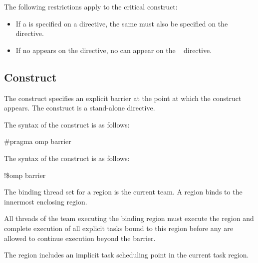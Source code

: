 \fortranspecificstart
The following restrictions apply to the critical construct:

\begin{itemize}
\item If a  is specified on a  directive, the same  must also be 
specified on the ~ directive. 

\item If no  appears on the  directive, no  can appear on the 
~ directive.
\end{itemize}
\fortranspecificend











\subsection{ Construct}
\label{subsec:barrier Construct}
\summary
The  construct specifies an explicit barrier at the point at which the construct 
appears. The  construct is a stand-alone directive.

\syntax
\ccppspecificstart
The syntax of the  construct is as follows:

\begin{boxedcode}
\#pragma omp barrier 
\end{boxedcode}
\ccppspecificend

\fortranspecificstart
The syntax of the  construct is as follows:

\begin{boxedcode}
!\$omp barrier
\end{boxedcode}
\fortranspecificend

\binding
The binding thread set for a  region is the current team. A  region 
binds to the innermost enclosing  region. 

\descr
All threads of the team executing the binding  region must execute the 
 region and complete execution of all explicit tasks bound to this  
region before any are allowed to continue execution beyond the barrier.

The  region includes an implicit task scheduling point in the current task 
region.

